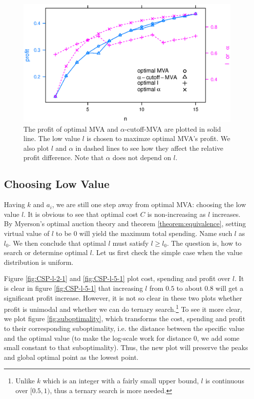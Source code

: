 \begin{figure}
\centering
    \includegraphics[width=\linewidth]{figures/cutoff_.2_.1_15.eps}
    \caption{The profit of optimal MVA and $\alpha$-cutoff-MVA are plotted in
    solid line.  The low value $l$ is chosen to maximze optimal MVA's profit.
    We also plot $l$ and $\alpha$ in dashed lines to see how they affect the
    relative profit difference.  Note that $\alpha$ does not depend on
    $l$.}\label{fig:cutoff}
\end{figure}

\subsection{Choosing Low Value}

Having $k$ and $a_i$, we are still one step away from optimal MVA: choosing the low
value $l$. It is obvious to see that optimal cost $C$ is non-increasing as $l$
increases. By Myerson's optimal auction theory and theorem
\ref{theorem:equivalence}, setting virtual value of $l$ to be $0$ will yield
the maximum total spending. Name such $l$ as $l_0$. We then conclude that
optimal $l$ must satisfy $l \geq l_0$. The
question is, how to search or determine optimal $l$. Let us first check the simple
case when the value distribution is uniform.

Figure \ref{fig:CSP-l-2-1} and \ref{fig:CSP-l-5-1} plot cost, spending and profit
over $l$. It is clear in figure \ref{fig:CSP-l-5-1} that increasing $l$ from $0.5$ to about $0.8$
will get a significant profit increase. However, it is not so clear in these two plots
whether profit is unimodal and whether we can do ternary search.\footnote{Unlike $k$ which is
an integer with a fairly small upper bound, $l$ is continuous over $[0.5, 1)$, 
thus a ternary search is more needed.}
To see it more clear, we plot figure \ref{fig:suboptimality},
which transforms the cost, spending and profit to their corresponding suboptimality, i.e.
the distance between the specific value and the optimal value (to make the log-scale work
for distance $0$, we add some small constant to that suboptimality). Thus, the new plot will
preserve the peaks and global optimal point as the lowest point.


